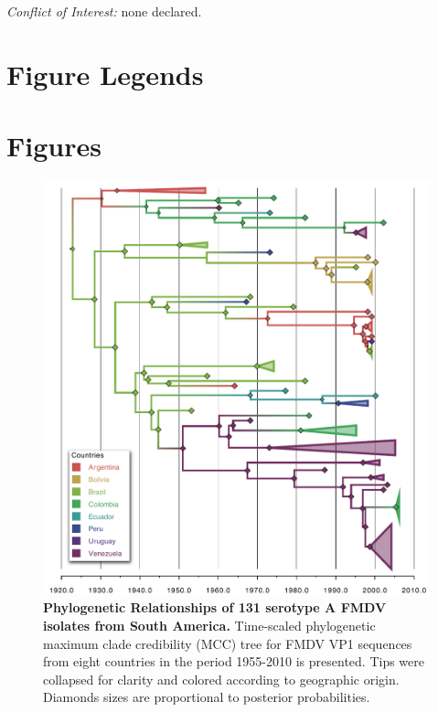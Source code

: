\documentclass[10pt]{article}
\begin{document}
\emph{Conflict of Interest:} none declared.

\newpage

\newpage
\section*{Figure Legends}
\newpage
\section{Figures}
\begin{figure}[!ht]
\begin{center}
\includegraphics[scale=.85]{FIGURES/A.pdf}
\end{center}
\caption{
{\bf Phylogenetic Relationships of 131 serotype A FMDV isolates from South America.} Time-scaled phylogenetic maximum clade credibility (MCC) tree for FMDV VP1 sequences from eight countries in the period 1955-2010 is presented. Tips were collapsed for clarity and colored according to geographic origin. Diamonds sizes are proportional to posterior probabilities.\\
}
\label{fig:Atree}
\end{figure}
\end{document}
